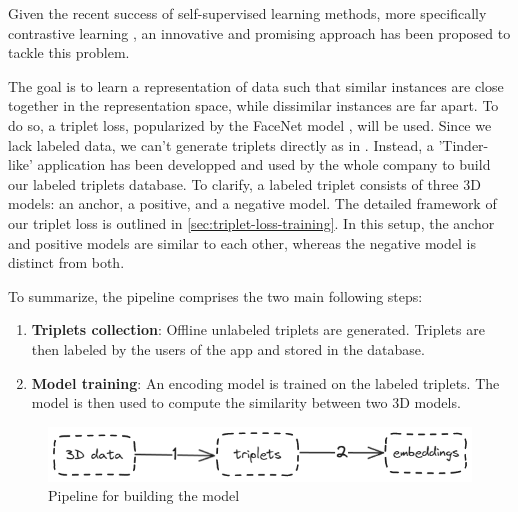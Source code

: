 Given the recent success of self-supervised learning methods, more specifically contrastive learning \cite{radfordLearningTransferableVisual2021,yuPointBERTPretraining3D2022,liuOpenShapeScaling3D2023}, an innovative and promising approach has been proposed to tackle this problem.

The goal is to learn a representation of data such that similar instances are close together in the representation space, while dissimilar instances are far apart. To do so, a triplet loss, popularized by the FaceNet model \cite{schroffFaceNetUnifiedEmbedding2015}, will be used. Since we lack labeled data, we can't generate triplets directly as in \cite{schroffFaceNetUnifiedEmbedding2015}. Instead, a 'Tinder-like' application has been developped and used by the whole company to build our labeled triplets database. To clarify, a labeled triplet consists of three 3D models: an anchor, a positive, and a negative model. The detailed framework of our triplet loss is outlined in \autoref{sec:triplet-loss-training}. In this setup, the anchor and positive models are similar to each other, whereas the negative model is distinct from both.

To summarize, the pipeline comprises the two main following steps:
\begin{enumerate}
    \item \textbf{Triplets collection}: Offline unlabeled triplets are generated. Triplets are then labeled by the users of the app and stored in the database.
    \item \textbf{Model training}: An encoding model is trained on the labeled triplets. The model is then used to compute the similarity between two 3D models.
\end{enumerate}

\begin{figure}[]
    \centering
    \includegraphics[width=0.8\columnwidth]{images/steps.png}
    \caption{Pipeline for building the model}   
    \label{fig:steps}
\end{figure}